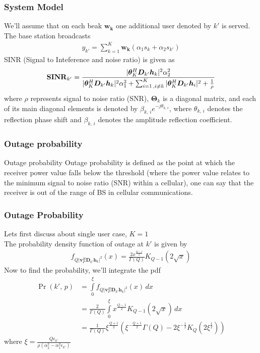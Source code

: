 \documentclass{beamer}
\providecommand{\pr}[1]{\ensuremath{\Pr\left(#1\right)}}
\providecommand{\brak}[1]{\ensuremath{\left(#1\right)}}
\providecommand{\abs}[1]{\vert#1\vert}
\begin{document}
\begin{frame}
\frametitle{System Model}
We'll assume that on each beak $\boldsymbol{w_k}$ one additional user denoted by $k'$ is served.
The base station broadcasts
\begin{align}
y_{k'}=\displaystyle\sum_{k=1}^K \boldsymbol{w_k}\brak{\alpha_1 s_k+\alpha_2 s_{k'}}
\end{align}
SINR (Signal to Inteference and noise ratio) is given as
\begin{align}
\text{\textbf{SINR}}_{k'}=\frac{\abs{\boldsymbol{\theta}_K^H \boldsymbol{D}_{k'}\boldsymbol{h}_k}^2\alpha_2^2}{\abs{\boldsymbol{\theta}_K^H \boldsymbol{D}_{k'}\boldsymbol{h}_k}^2\alpha_1^2+\sum_{i=1\,,i\neq k}^{K}\abs{\boldsymbol{\theta}_K^H \boldsymbol{D}_{k'}\boldsymbol{h}_i}^2+\frac{1}{\rho}}
\end{align}
where $\rho$ represents signal to noise ratio (SNR), $\boldsymbol{\Theta}_k$ is a diagonal matrix, and each of its main diagonal elements is denoted by $\beta_{k,\,i}e^{-j\theta_{k,\, i}}$, where $\theta_{k,\, i}$ denotes the reflection phase shift and $\beta_{k,\, i}$ denotes the amplitude reflection coefficient.
\end{frame}
\begin{frame}
\frametitle{Outage probability}
\begin{block}{Outage probability}
Outage probability is defined as the point at which the receiver power value falls below the threshold (where the power value relates to the minimum signal to noise ratio (SNR) within a cellular), one can say that the receiver is out of the range of BS in cellular communications.
\end{block}

\end{frame}
\begin{frame}
\frametitle{Outage Probability}
Lets first discuss about single user case, $K=1$\\
The probability density function of outage at $k'$ is given by
\begin{align}
f_{Q\abs{\boldsymbol{v}_P^H \boldsymbol{D}_{k'}\boldsymbol{h}_k}^2}(x)=\frac{2x^{\frac{Q-1}{2}}}{\Gamma(Q)} K_{Q-1}\brak{2\sqrt{x}}
\end{align}
Now to find the probability, we'll integrate the pdf
\begin{align}
\pr{k',\,p}&=\int\limits_{0}^{\xi} f_{Q\abs{\boldsymbol{v}_P^H \boldsymbol{D}_{k'}\boldsymbol{h}_k}^2}(x)\,dx\\
&=\frac{2}{\Gamma(Q)}\int\limits_{0}^{\xi}x^{\frac{Q-1}{2}}K_{Q-1}\brak{2\sqrt{x}}\,dx\\
&=\frac{1}{\Gamma(Q)}\xi^{\frac{Q+1}{2}}\brak{\xi^{-\frac{Q+1}{2}}\Gamma(Q)-2\xi^{-\frac{1}{2}}K_{Q}\brak{2\xi^\frac{1}{2}}}
\end{align}
where $\xi=\frac{Q\epsilon_{k'}}{\rho(\alpha_2^2-\alpha_1^2\epsilon_{k'})}$
\end{frame}
\end{document}
